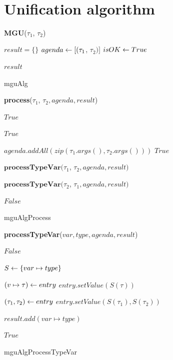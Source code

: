 \documentclass[a4paper,oneside]{memoir}
\begin{document}
~

\section{Unification algorithm}

{\textbf{MGU}($\tau_1$, $\tau_2$)}{
	
	$result = \{\}$ \;
	$agenda \leftarrow [(\tau_1$, $\tau_2)]$ \;	
	$isOK \leftarrow True$ \;

	\;	
	
	\;
	
	 {
		\Return $result$
	} \Else {
		\Return $\bot$				
	}
	
}{mguAlg}

{\textbf{process}($\tau_1$, $\tau_2, agenda, result$)}{
	\;
	 {
		\Return $True$
	} \;

	 {
		\Return $True$
	} \;

	 {
		$agenda.addAll(zip(\tau_1.args(), \tau_2.args()))$ \;
		\Return $True$
	} \;
	
	 {
		\Return $\textbf{processTypeVar}(\tau_1$, $\tau_2, agenda, result)$
	} \;
	
	 {
		\Return $\textbf{processTypeVar}(\tau_2$, $\tau_1, agenda, result)$
	} \;	
	
	\Return $False$
	
}{mguAlgProcess}

{\textbf{processTypeVar}($var, type, agenda, result$)}{
	\;
	
	 {
		\Return $False$
	} \;

	$S \leftarrow \{var \mapsto type \}$\;\;

	 {
		$(v \mapsto \tau) \leftarrow entry$ \;
		$entry.setValue( S(\tau) )$
	} \;

	 {
		$(\tau_1, \tau_2) \leftarrow entry$ \;
		$entry.setValue( S(\tau_1), S(\tau_2) )$
	} \;

	
	$result.add(var \mapsto type)$ \;\;
	
	\Return $True$
	
}{mguAlgProcessTypeVar}




\backmatter
\end{document}
